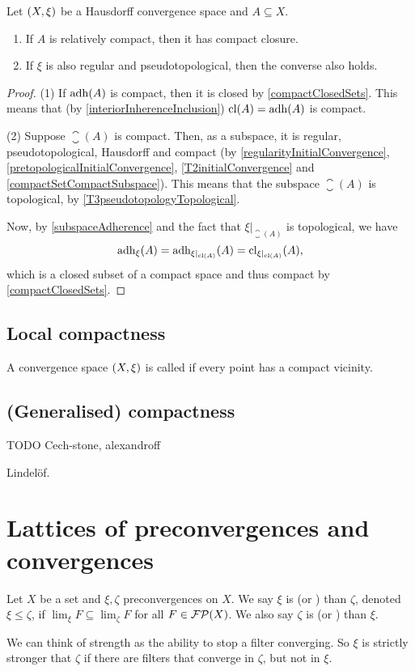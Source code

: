 \begin{proposition}
Let $\left( X,\xi \right)$ be a Hausdorff convergence space and $A\subseteq X$.
\begin{enumerate}
\item If $A$ is relatively compact, then it has compact closure.
\item If $\xi$ is also regular and pseudotopological, then the converse also holds.
\end{enumerate}
\end{proposition}
\begin{proof}
(1) If $\operatorname{adh}(A)$ is compact, then it is closed by \ref{compactClosedSets}. This means that (by \ref{interiorInherenceInclusion}) $\operatorname{cl}(A) = \operatorname{adh}(A)$ is compact.

(2) Suppose $\closure(A)$ is compact. Then, as a subspace, it is regular, pseudotopological, Hausdorff and compact (by \ref{regularityInitialConvergence}, \ref{pretopologicalInitialConvergence}, \ref{T2initialConvergence} and \ref{compactSetCompactSubspace}). This means that the subspace $\closure(A)$ is topological, by \ref{T3pseudotopologyTopological}.

Now, by \ref{subspaceAdherence} and the fact that $\xi|_{\closure(A)}$ is topological, we have
\[ \operatorname{adh}_\xi(A) = \operatorname{adh}_{\xi|_{\operatorname{cl}(A)}}(A) = \operatorname{cl}_{\xi|_{\operatorname{cl}(A)}}(A), \]
which is a closed subset of a compact space and thus compact by \ref{compactClosedSets}.
\end{proof}

\subsection{Local compactness}
\begin{definition}
A convergence space $\left( X, \xi \right)$ is called  if every point has a compact vicinity.
\end{definition}

\subsection{(Generalised) compactness}
TODO Cech-stone, alexandroff

Lindelöf.

\section{Lattices of preconvergences and convergences}
\begin{definition}
Let $X$ be a set and $\xi,\zeta$ preconvergences on $X$. We say $\xi$ is  (or ) than $\zeta$, denoted $\xi \leq \zeta$, if $\lim_\xi F \subseteq \lim_\zeta F$ for all $F\in\operatorname{\mathcal{FP}}(X)$. We also say $\zeta$ is  (or ) than $\xi$.
\end{definition}
We can think of strength as the ability to stop a filter converging. So $\xi$ is strictly stronger that $\zeta$ if there are filters that converge in $\zeta$, but not in $\xi$. 

